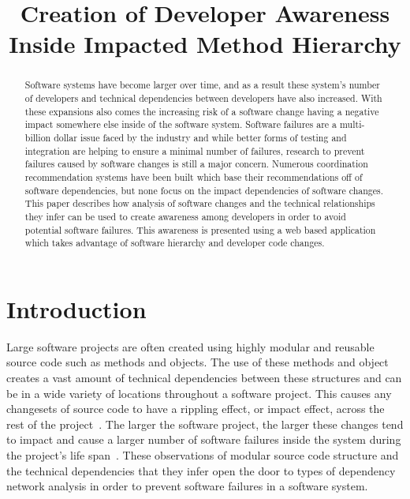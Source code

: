 \documentclass[conference]{IEEEtran}
\begin{document}
\title{Creation of Developer Awareness Inside Impacted Method Hierarchy}

\author{
}

\maketitle

\begin{abstract}
Software systems have become larger over time, and as a result these system's number of developers
and technical dependencies between developers have also increased. With these expansions also
comes the increasing risk of a software change having a negative impact somewhere else inside
of the software system. Software failures are a multi-billion dollar issue faced by the industry and
while better forms of testing and integration are helping to ensure a minimal number of failures, 
research to prevent failures caused by software changes is still a major concern. Numerous coordination
recommendation systems have been built which base their recommendations off of software dependencies,
but none focus on the impact dependencies of software changes. This paper describes how analysis
of software changes and the technical relationships they infer can be used to create awareness among
developers in order to avoid potential software failures. This awareness is presented using a web based
application which takes advantage of software hierarchy and developer code changes.
\end{abstract}

\section{Introduction}
Large software projects are often created using highly modular and reusable source code such as methods
and objects. The use of these methods and object creates a vast amount of technical dependencies between
these structures and can be in a wide variety of locations throughout a software project. This causes any
changesets of source code to have a rippling effect, or impact effect, across the rest of the project~\cite{Acharya:2011:PCI}. 
The larger the software project, the larger these changes tend to impact
and cause a larger number of software failures inside the system during the project's life span~\cite{Zimmermann:2008:PDU}. 
These observations of modular source code structure and the
technical dependencies that they infer open the door to types of dependency network analysis
in order to prevent software failures in a software system.\\
\end{document}
